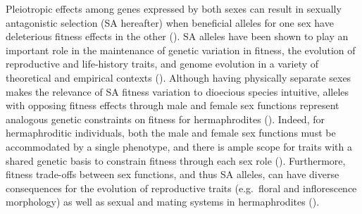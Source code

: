 \documentclass{article}
\begin{document}
Pleiotropic effects among genes expressed by both sexes can result in sexually antagonistic selection (SA hereafter) when beneficial alleles for one sex have deleterious fitness effects in the other (\citealt{Kidwell1977, Rice1992, ConnClark2012}). SA alleles have been shown to play an important role in the maintenance of genetic variation in fitness, the evolution of reproductive and life-history traits, and genome evolution in a variety of theoretical and empirical contexts (\citealt{Barson2015, BondChen2009, CoxCals2010, CharlesworthHughes1999, ConnClark2012, Fry2010, Prout2000, Rice1992, RiceChipp2001}). Although having physically separate sexes makes the relevance of SA fitness variation to dioecious species intuitive, alleles with opposing fitness effects through male and female sex functions represent analogous genetic constraints on fitness for hermaphrodites (\citealt{Abbott2011, JordanConn2014}). Indeed, for hermaphroditic individuals, both the male and female sex functions must be accommodated by a single phenotype, and there is ample scope for traits with a shared genetic basis to constrain fitness through each sex role (\citealt{Abbott2011, Barrett2002, Conner2006}). Furthermore, fitness trade-offs between sex functions, and thus SA alleles, can have diverse consequences for the evolution of reproductive traits (e.g.~floral and inflorescence morphology) as well as sexual and mating systems in hermaphrodites (\citealt{LloydWebb1986,WebbLloyd1986, Barrett2002, Abbott2011}).
\end{document}
